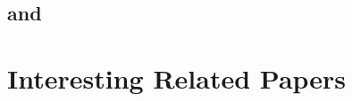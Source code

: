 \documentclass[twoside]{article}
\theoremstyle{definition}
\begin{document}
\subsection*{\citet{coate2004group} and \citet{coate2008performance}}

\subsection*{\citet{dellavigna2016voting}}

\subsection*{\citet{fujiwara2016habit}}

\section{Interesting Related Papers}



\newpage


\end{document}
